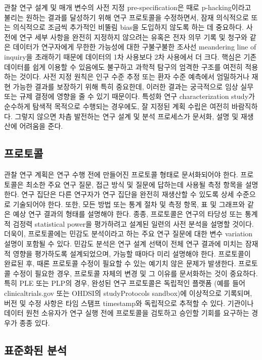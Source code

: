 \documentclass[10.5pt]{book}
\theoremstyle{definition}
\theoremstyle{definition}
\theoremstyle{definition}
\theoremstyle{remark}
\begin{document}
관찰 연구 설계 및 매개 변수의 사전 지정 pre-specification은 때로
p-hacking이라고 불리는 원하는 결과를 달성하기 위해 연구 프로토콜을
수정하면서, 잠재 의식적으로 또는 의식적으로 조금씩 추가적인 비뚤림
bias을 도입하지 않도록 하는 데 중요하다. 사전에 연구 세부 사항을 완전히
지정하지 않으려는 유혹은 전자 의무 기록 및 청구와 같은 데이터가
연구자에게 무한한 가능성에 대한 구불구불한 조사선 meandering line of
inquiry을 초래하기 때문에 데이터의 1차 사용보다 2차 사용에서 더 크다.
핵심은 기존 데이터를 쉽게 이용할 수 있음에도 불구하고 과학적 탐구의
엄격한 구조를 여전히 적용하는 것이다. 사전 지정 원칙은 인구 수준 추정
또는 환자 수준 예측에서 엄밀하거나 재현 가능한 결과를 보장하기 위해 특히
중요한데, 이러한 결과는 궁극적으로 임상 실무 또는 규제 결정에 영향을 줄
수 있기 때문이다. 특성화 연구 characterization study가 순수하게 탐색적
목적으로 수행되는 경우에도, 잘 지정된 계획 수립은 여전히 바람직하다.
그렇지 않으면 차츰 발전하는 연구 설계 및 분석 프로세스가 문서화, 설명 및
재생산에 어려움을 준다.

\subsection{프로토콜}


관찰 연구 계획은 연구 수행 전에 만들어진 프로토콜 형태로 문서화되어야
한다. 프로토콜은 최소한 주요 연구 질문, 접근 방식 및 질문에 답하는데
사용될 측정 항목을 설명한다. 연구 집단은 다른 연구자가 연구 집단을
완전히 재생산할 수 있도록 상세 수준으로 기술되어야 한다. 또한, 모든 방법
또는 통계 절차 및 측정 항목, 표 및 그래프와 같은 예상 연구 결과의 형태를
설명해야 한다. 종종, 프로토콜은 연구의 타당성 또는 통계적 검정력
statistical power을 평가하려고 설계된 일련의 사전 분석을 설명할 것이다.
더욱이, 프로토콜에는 민감도 분석이라고 하는 주요 연구 질문에 대한 변수
variation 설명이 포함될 수 있다. 민감도 분석은 연구 설계 선택이 전체
연구 결과에 미치는 잠재적 영향을 평가하도록 설계되었으며, 가능할 때마다
미리 설명해야 한다. 프로토콜이 완료된 후, 때론 프로토콜 수정이 필요할 수
있는 예기치 않은 문제가 발생한다. 프로토콜 수정이 필요한 경우, 프로토콜
자체의 변경 및 그 이유를 문서화하는 것이 중요하다. 특히 PLE 또는 PLP의
경우, 완성된 연구 프로토콜은 독립적인 플랫폼 (예를 들어
clinicaltrials.gov 또는 OHDSI의 studyProtocols sandbox)에 이상적으로
기록되며, 버전 및 수정 사항은 타임 스탬프 timestamp와 독립적으로 추적할
수 있다. 기관이나 데이터 원천 소유자가 연구 실행 전에 프로토콜을
검토하고 승인할 기회를 요구하는 경우가 종종 있다.

\subsection{표준화된 분석}\label{-}
\end{document}
